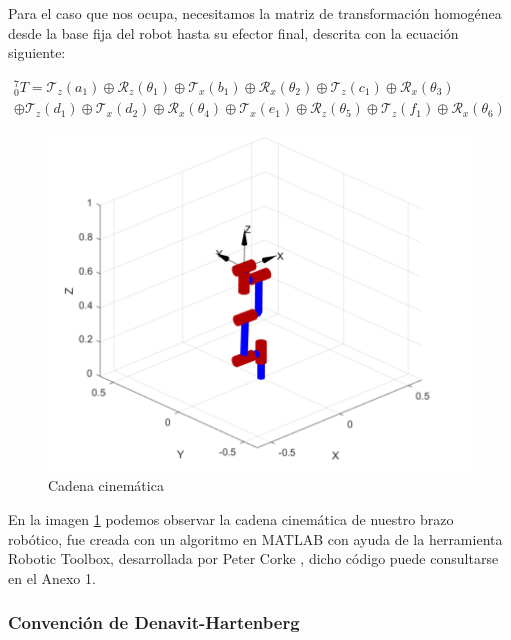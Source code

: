 Para el caso que nos ocupa, necesitamos la matriz de transformación homogénea desde la base fija del robot hasta su efector final, descrita con la ecuación siguiente:

\begin{equation}
\label{eq:homogeneustransformationmatrix}
\begin{split}
{}_{0}^{7}T = \mathscr{T}_z(a_1)\oplus\mathscr{R}_z(\theta_1)\oplus\mathscr{T}_x(b_1)\oplus\mathscr{R}_x(\theta_2)\oplus\mathscr{T}_z(c_1)\oplus\mathscr{R}_x(\theta_3) \\ \oplus\mathscr{T}_z(d_1)\oplus\mathscr{T}_x(d_2)\oplus\mathscr{R}_x(\theta_4)\oplus\mathscr{T}_x(e_1)\oplus\mathscr{R}_z(\theta_5)\oplus\mathscr{T}_z(f_1)\oplus\mathscr{R}_x(\theta_6)
\end{split}
\end{equation}

\begin{figure}
    \centering
    \includegraphics[scale=0.6]{./img/chapter4/KinematicDiagramML.png}
    \caption{Cadena cinemática}
    \label{fig:kinematicchain}
\end{figure}


En la imagen \ref{fig:kinematicchain} podemos observar la cadena cinemática de nuestro brazo robótico, fue creada con un algoritmo en MATLAB con ayuda de la herramienta Robotic Toolbox, desarrollada por Peter Corke \cite{Corke2017}, dicho código puede consultarse en el Anexo 1.


\subsubsection{Convención de Denavit-Hartenberg}


